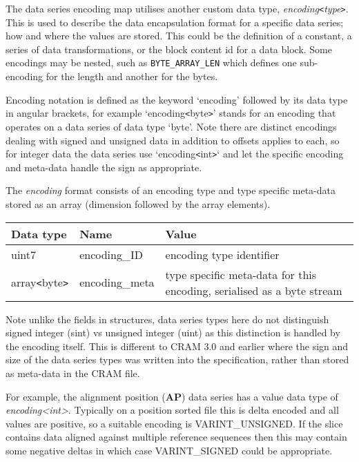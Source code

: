 \documentclass[a4paper]{article}
\begin{document}
The data series encoding map utilises another custom data type, \textit{encoding\texttt{<}type\texttt{>}}.
This is used to describe the data encapsulation format for a specific data series; how and where the values are stored.  This could be
the definition of a constant, a series of data transformations, or the
block content id for a data block.  Some encodings may be nested,
such as \texttt{BYTE\_ARRAY\_LEN} which defines one sub-encoding for the
length and another for the bytes.

Encoding notation is defined as the keyword `encoding' followed by its data type in angular brackets, for example `encoding\texttt{<}byte\texttt{>}' stands for an encoding that operates on a data series of data type `byte'.
Note there are distinct encodings dealing with signed and unsigned
data in addition to offsets applies to each, so for integer data the
data series use `encoding\texttt{<}int\texttt{>}` and let the specific
encoding and meta-data handle the sign as appropriate.

The \textit{encoding} format consists of an encoding type and type specific meta-data stored as an array (dimension followed by the array elements).

\begin{tabular}{|l|>{\raggedright}p{120pt}|>{\raggedright}p{260pt}|}
\hline
\textbf{Data type} & \textbf{Name} & \textbf{Value}
\tabularnewline
\hline
uint7 & encoding\_ID & encoding type identifier\tabularnewline
\hline
array\texttt{<}byte\texttt{>} & encoding\_meta & type specific meta-data for this encoding, serialised as a byte stream\tabularnewline
\hline
\end{tabular}

\vskip 10pt

Note unlike the fields in structures, data series types here do not
distinguish signed integer (sint) vs unsigned integer (uint) as this
distinction is handled by the encoding itself.  This is different to
CRAM 3.0 and earlier where the sign and size of the data series types
was written into the specification, rather than stored as meta-data in
the CRAM file.

For example, the alignment position (\textbf{AP}) data series has a value data type of \textit{encoding<int>}.
Typically on a position sorted file this is delta encoded and all
values are positive, so a suitable encoding is VARINT\_UNSIGNED.  If
the slice contains data aligned against multiple reference sequences
then this may contain some negative deltas in which case
VARINT\_SIGNED could be appropriate.
\end{document}
